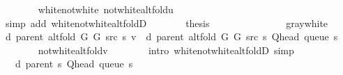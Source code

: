 \begin{isabellebody}
\ \ \ \ \ \ \isamarkupfalse%
\ white{\isacharunderscore}{\kern0pt}not{\isacharunderscore}{\kern0pt}white\ not{\isacharunderscore}{\kern0pt}white{\isacharunderscore}{\kern0pt}alt{\isacharunderscore}{\kern0pt}fold{\isacharunderscore}{\kern0pt}u\isanewline
\ \ \ \ \ \ \isamarkupfalse%
\ {\isacharparenleft}{\kern0pt}simp\ add{\isacharcolon}{\kern0pt}\ white{\isacharunderscore}{\kern0pt}not{\isacharunderscore}{\kern0pt}white{\isacharunderscore}{\kern0pt}alt{\isacharunderscore}{\kern0pt}foldD{\isacharparenleft}{\kern0pt}{}{\isacharparenright}{\kern0pt}{\isacharparenright}{\kern0pt}\isanewline
\ \ \ \ \isamarkupfalse%
\ \isamarkupfalse%
\ {\isacharquery}{\kern0pt}thesis\isanewline
\ \ \ \ \ \ \isacommand{{\isachardot}{\kern0pt}}\isamarkupfalse%
\isanewline
\ \ \isamarkupfalse%
\isanewline
\ \ \ \ \isamarkupfalse%
\ gray{\isacharunderscore}{\kern0pt}white\isanewline
\ \ \ \ \isamarkupfalse%
\ {\isachardoublequoteopen}d\ {\isacharparenleft}{\kern0pt}parent\ {\isacharparenleft}{\kern0pt}alt{\isacharunderscore}{\kern0pt}fold\ G{}\ G{}\ src\ s{\isacharparenright}{\kern0pt}{\isacharparenright}{\kern0pt}\ v\ {\isacharequal}{\kern0pt}\ d\ {\isacharparenleft}{\kern0pt}parent\ {\isacharparenleft}{\kern0pt}alt{\isacharunderscore}{\kern0pt}fold\ G{}\ G{}\ src\ s{\isacharparenright}{\kern0pt}{\isacharparenright}{\kern0pt}\ {\isacharparenleft}{\kern0pt}Q{\isacharunderscore}{\kern0pt}head\ {\isacharparenleft}{\kern0pt}queue\ s{\isacharparenright}{\kern0pt}{\isacharparenright}{\kern0pt}\ {\isacharplus}{\kern0pt}\ {}{\isachardoublequoteclose}\isanewline
\ \ \ \ \ \ \isamarkupfalse%
\ not{\isacharunderscore}{\kern0pt}white{\isacharunderscore}{\kern0pt}alt{\isacharunderscore}{\kern0pt}fold{\isacharunderscore}{\kern0pt}v\isanewline
\ \ \ \ \ \ \isamarkupfalse%
\ {\isacharparenleft}{\kern0pt}intro\ white{\isacharunderscore}{\kern0pt}not{\isacharunderscore}{\kern0pt}white{\isacharunderscore}{\kern0pt}alt{\isacharunderscore}{\kern0pt}foldD{\isacharparenleft}{\kern0pt}{}{\isacharparenright}{\kern0pt}{\isacharparenright}{\kern0pt}\ simp\isanewline
\ \ \ \ \isamarkupfalse%
\ \isamarkupfalse%
\ {\isachardoublequoteopen}{\isachardot}{\kern0pt}{\isachardot}{\kern0pt}{\isachardot}{\kern0pt}\ {\isacharequal}{\kern0pt}\ d\ {\isacharparenleft}{\kern0pt}parent\ s{\isacharparenright}{\kern0pt}\ {\isacharparenleft}{\kern0pt}Q{\isacharunderscore}{\kern0pt}head\ {\isacharparenleft}{\kern0pt}queue\ s{\isacharparenright}{\kern0pt}{\isacharparenright}{\kern0pt}\ {\isacharplus}{\kern0pt}\ {}{\isachardoublequoteclose}\isanewline

\end{isabellebody}
